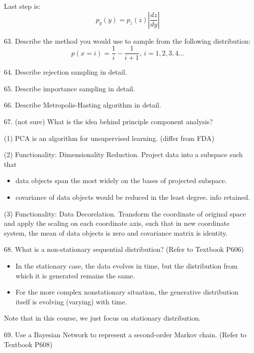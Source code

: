 \documentclass[11pt,a4paper]{article}
\begin{document}
Last step is:
$$ p_y (y) = p_z (z) | \frac{dz}{dy}| $$

63. Describe the method you would use to sample from the following distribution:
$$ p(x=i) = \frac{1}{i} - \frac{1}{i+1},\ i = 1,2,3,4 ...$$

64. Describe rejection sampling in detail.

65. Describe importance sampling in detail.

66. Describe Metropolis-Hasting algorithm in detail.

67. (not sure) What is the idea behind principle component analysis?

(1) PCA is an algorithm for unsupervised learning. (differ from FDA)

(2) Functionality: Dimensionality Reduction. Project data into a subspace such that 
\begin{itemize}
    \item data objects span the most widely on the bases of projected subspace.
    \item covariance of data objects would be reduced in the least degree. info retained.
\end{itemize}

(3) Functionality: Data Decorelation. Transform the coordinate of original space and apply the scaling on each coordinate axis, such that in new coordinate system, the mean of data objects is zero and covariance matrix is identity.

68. What is a non-stationary sequential distribution? (Refer to Textbook P606)

\begin{itemize}
     \item In the stationary case, the data evolves in time, but the distribution from which it is generated remains the same.
     \item For the more complex nonstationary situation, the generative distribution itself is evolving (varying) with time. 
    \end{itemize}
Note that in this course, we just focus on stationary distribution.

69. Use a Bayesian Network to represent a second-order Markov chain. (Refer to Textbook P608)
\end{document}
